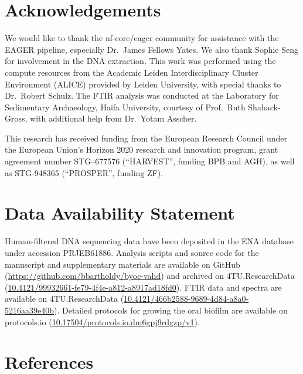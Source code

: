 \documentclass[
]{article}
\begin{document}
\hypertarget{acknowledgements}{%
\section*{Acknowledgements}\label{acknowledgements}}

We would like to thank the nf-core/eager community for assistance with
the EAGER pipeline, especially Dr.~James Fellows Yates. We also thank
Sophie Seng for involvement in the DNA extraction. This work was
performed using the compute resources from the Academic Leiden
Interdisciplinary Cluster Environment (ALICE) provided by Leiden
University, with special thanks to Dr.~Robert Schulz. The FTIR analysis
was conducted at the Laboratory for Sedimentary Archaeology, Haifa
University, courtesy of Prof.~Ruth Shahack-Gross, with additional help
from Dr.~Yotam Asscher.

This research has received funding from the European Research Council
under the European Union's Horizon 2020 research and innovation program,
grant agreement number STG--677576 (``HARVEST'', funding BPB and AGH),
as well as STG-948365 (``PROSPER'', funding ZF).

\hypertarget{data-availability-statement}{%
\section*{Data Availability
Statement}\label{data-availability-statement}}

Human-filtered DNA sequencing data have been deposited in the ENA
database under accession PRJEB61886. Analysis scripts and source code
for the manuscript and supplementary materials are available on GitHub
(\url{https://github.com/bbartholdy/byoc-valid}) and archived on
4TU.ResearchData
(\href{https://doi.org/10.4121/99932661-fe79-4f4e-a812-a8917ad18fd0}{10.4121/99932661-fe79-4f4e-a812-a8917ad18fd0}).
FTIR data and spectra are available on 4TU.ResearchData
(\href{https://doi.org/10.4121/466b2588-9689-4d84-a8a0-5216aa39e40b}{10.4121/466b2588-9689-4d84-a8a0-5216aa39e40b}).
Detailed protocols for growing the oral biofilm are available on
protocols.io
(\href{https://dx.doi.org/10.17504/protocols.io.dm6gpj9rdgzp/v1}{10.17504/protocols.io.dm6gpj9rdgzp/v1}).

\hypertarget{references}{%
\section*{References}\label{references}}
\end{document}
